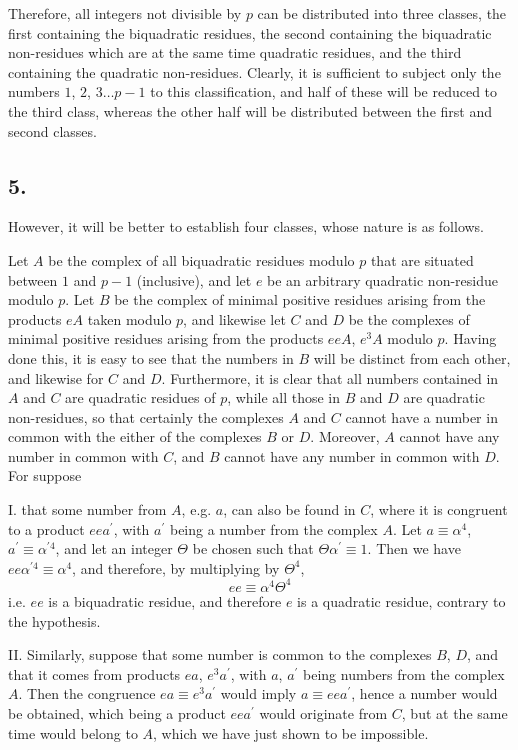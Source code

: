 \documentclass[twoside,12pt]{memoir}
\begin{document}
Therefore, all integers not divisible by \(p\) can be distributed into three classes, the first containing the biquadratic residues, the second containing the biquadratic non-residues which are at the same time quadratic residues, and the third containing the quadratic non-residues. Clearly, it is sufficient to subject only the numbers \(1\), \(2\), \(3 \ldots p-1\) to this classification, and half of these will be reduced to the third class, whereas the other half will be distributed between the first and second classes.
%

\subsection*{5.}

However, it will be better to establish four classes, whose nature is as follows.

Let \(A\) be the complex of all biquadratic residues modulo \(p\) that are situated between \(1\) and \(p-1\) (inclusive), and let \(e\) be an arbitrary quadratic non-residue modulo \(p\). Let \(B\) be the complex of minimal positive residues arising from the products \(e A\) taken modulo \(p\), and likewise let  \(C\) and \(D\) be the complexes of minimal positive residues arising from the products \(e e A\), \(e^{3} A\) modulo \(p\). Having done this, it is easy to see that the numbers in \(B\) will be distinct from each other, and likewise for \(C\) and \(D\). Furthermore, it is clear that all numbers contained in \(A\) and \(C\) are quadratic residues of \(p\), while all those in \(B\) and \(D\) are quadratic non-residues, so that certainly the complexes \(A\) and \(C\) cannot have a number in common with the either of the complexes \(B\) or \(D\). Moreover, \(A\) cannot have any number in common with \(C\), and \(B\) cannot have any number in common with \(D\). For suppose

I. that some number from \(A\), e{.}g{.} \(a\), can also be found in \(C\), where it is congruent to a product \(e e a^{\prime}\), with \(a^{\prime}\) being a number from the complex \(A\). Let \(a \equiv \alpha^{4}\), \(a^{\prime} \equiv \alpha^{\prime 4}\), and let an integer \(\Theta\) be chosen such that \(\Theta \alpha^{\prime} \equiv 1\). Then we have \(e e \alpha^{\prime 4} \equiv \alpha^{4}\), and therefore, by multiplying by \(\Theta^{4}\),
\[e e \equiv \alpha^{4} \Theta^{4}\]
i{.}e{.} \(ee\) is a biquadratic residue, and therefore \(e\) is a quadratic residue, contrary to the hypothesis.

II. Similarly, suppose that some number is common to the complexes \(B\), \(D\), and that it comes from products \(e a\), \(e^{3} a^{\prime}\), with \(a\), \(a^{\prime}\) being numbers from the complex \(A\).  Then the congruence \(e a \equiv e^{3} a^{\prime}\) would imply \(a \equiv e e a^{\prime}\), hence a number would be obtained, which being a product \(e e a^{\prime}\) would originate from \(C\), but at the same time would belong to \(A\), which we have just shown to be impossible.
%
\end{document}
